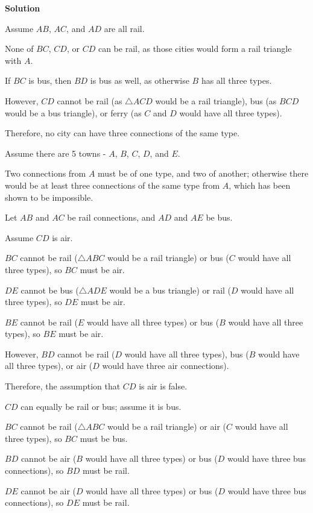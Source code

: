 \begin{enumerate}
 



\textbf{Solution}

Assume $AB$, $AC$, and $AD$ are all rail.

 None of $BC$, $CD$, or $CD$ can be rail, as those cities would form a rail triangle with $A$.

 If $BC$ is bus, then $BD$ is bus as well, as otherwise $B$ has all three types.

 However, $CD$ cannot be rail (as $\triangle ACD$ would be a rail triangle), bus (as $BCD$ would be a bus triangle), or ferry (as $C$ and $D$ would have all three types).

 Therefore, no city can have three connections of the same type.

 
Assume there are 5 towns - $A$, $B$, $C$, $D$, and $E$.

 Two connections from $A$ must be of one type, and two of another; otherwise there would be at least three connections of the same type from $A$, which has been shown to be impossible.

 Let $AB$ and $AC$ be rail connections, and $AD$ and $AE$ be bus.

 Assume $CD$ is air.

 $BC$ cannot be rail ($\triangle ABC$ would be a rail triangle) or bus ($C$ would have all three types), so $BC$ must be air.

 $DE$ cannot be bus ($\triangle ADE$ would be a bus triangle) or rail ($D$ would have all three types), so $DE$ must be air.

 $BE$ cannot be rail ($E$ would have all three types) or bus ($B$ would have all three types), so $BE$ must be air.

 However, $BD$ cannot be rail ($D$ would have all three types), bus ($B$ would have all three types), or air ($D$ would have three air connections).

 Therefore, the assumption that $CD$ is air is false.

 $CD$ can equally be rail or bus; assume it is bus.

 $BC$ cannot be rail ($\triangle ABC$ would be a rail triangle) or air ($C$ would have all three types), so $BC$ must be bus.

 $BD$ cannot be air ($B$ would have all three types) or bus ($D$ would have three bus connections), so $BD$ must be rail.

 $DE$ cannot be air ($D$ would have all three types) or bus ($D$ would have three bus connections), so $DE$ must be rail.


\end{enumerate}
